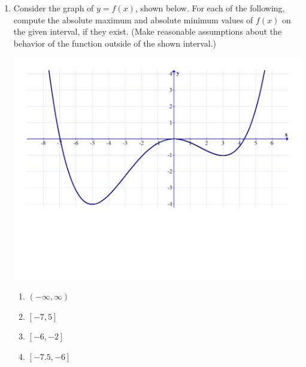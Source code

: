 \documentclass[12pt]{article}
\newif\ifans
\begin{document}
\begin{enumerate}

\item  Consider the graph of $y=f(x)$, shown below. For each of the following, compute the absolute maximum and absolute minimum values of $f(x)$ on the given interval, if they exist.  (Make reasonable assumptions about the behavior of the function outside of the shown interval.)

\begin{center}
\includegraphics[scale=0.5]{graph.pdf}
\end{center}

\begin{enumerate}

\item $(-\infty,\infty)$

\ifans{\fbox{No absolute maximum; Absolute minimum of $-4$ when $x=-5$}} \fi

\item $[-7,5]$

\ifans{\fbox{Absolute maximum of 2 when $x=5$; Absolute minimum of $-4$ when $x=-5$}} \fi

\item $[-6,-2]$

\ifans{\fbox{Absolute maximum of $-1$ when $x=-2$; Absolute minimum of $-4$ when $x=-5$}} \fi

\item $[-7.5,-6]$

\ifans{\fbox{Absolute maximum of $3$ when $x=-7.5$; Absolute minimum of $-3$ when $x=6$}} \fi


\end{enumerate}
\end{enumerate}
\end{document}
